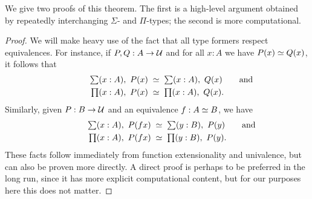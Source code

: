 We give two proofs of this theorem.
The first is a high-level argument obtained by repeatedly interchanging $\Sigma$- and $\Pi$-types; the second is more computational.

\begin{proof}
  We will make heavy use of the fact that all type formers respect equivalences.
  For instance, if $P,Q:A\to\mathcal{U}$ and for all $x:A$ we have $P(x) \simeq Q(x)$, it follows that
  \begin{align*}
    \sm{x:A}P(x) &\;\simeq\; \sm{x:A}Q(x)\mathrlap{\qquad\text{and}}\\
    \prd{x:A}P(x) &\;\simeq\; \prd{x:A}Q(x).
  \end{align*}
  Similarly, given $P:B\to\mathcal{U}$ and an equivalence $f:A \simeq B$, we have
  \begin{align}
    \sm{x:A}P(fx) &\;\simeq\; \sm{y:B}P(y)\mathrlap{\qquad\text{and}}\label{eq:sigma-baseequiv}\\
    \prd{x:A}P(fx) &\;\simeq\; \prd{y:B}P(y).\label{eq:pi-baseequiv}
  \end{align}
  These facts follow immediately from function extensionality and univalence, but can also be proven more directly.
  A direct proof is perhaps to be preferred in the long run, since it has more explicit computational content, but for our purposes here this does not matter.


\end{proof}

